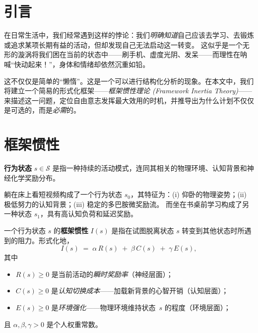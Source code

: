 
\section{引言}\label{sec:intro}

在日常生活中，我们经常遇到这样的悖论：我们\emph{明确知道}自己应该去学习、去锻炼或追求某项长期有益的活动，但却发现自己无法启动这一转变。
这似乎是一个无形的漩涡将我们困在当前的状态中——刷手机、虚度光阴、发呆——而理性在呐喊“快动起来！”，身体和情绪却依然沉重如铅。

这不仅仅是简单的“懒惰”。这是一个可以进行结构化分析的现象。在本文中，我们将建立一个简易的形式化框架——\emph{框架惯性理论 (Framework Inertia Theory)}——来描述这一问题，定位自由意志发挥最大效用的时机，并推导出为什么计划不仅仅是可选的，而是\emph{必需}的。

\section{框架惯性}\label{sec:inertia}

\begin{definition}[行为状态]\label{def:state}
\textbf{行为状态} $s \in \mathcal{S}$ 是指一种持续的活动模式，连同其相关的物理环境、认知背景和神经化学奖励分布。
\end{definition}

\begin{examplebox}
躺在床上看短视频构成了一个行为状态 $s_0$，其特征为：(i) 仰卧的物理姿势；(ii) 极低努力的认知背景；(iii) 稳定的多巴胺微奖励流。
而坐在书桌前学习构成了另一种状态 $s_1$，具有高认知负荷和延迟奖励。
\end{examplebox}

\begin{definition}[框架惯性]\label{def:inertia}
一个行为状态 $s$ 的\textbf{框架惯性} $I(s)$ 是指在试图脱离状态 $s$ 转变到其他状态时所遇到的阻力。形式化地，
\[
  I(s) \;=\; \alpha \, R(s) \;+\; \beta \, C(s) \;+\; \gamma \, E(s),
\]
其中
\begin{itemize}[nosep]
  \item $R(s) \geq 0$ 是当前活动的\emph{瞬时奖励率}（神经层面）；
  \item $C(s) \geq 0$ 是\emph{认知切换成本}——加载新背景的心智开销（认知层面）；
  \item $E(s) \geq 0$ 是\emph{环境强化}——物理环境维持状态~$s$ 的程度（环境层面）；
\end{itemize}
且 $\alpha, \beta, \gamma > 0$ 是个人权重常数。
\end{definition}

